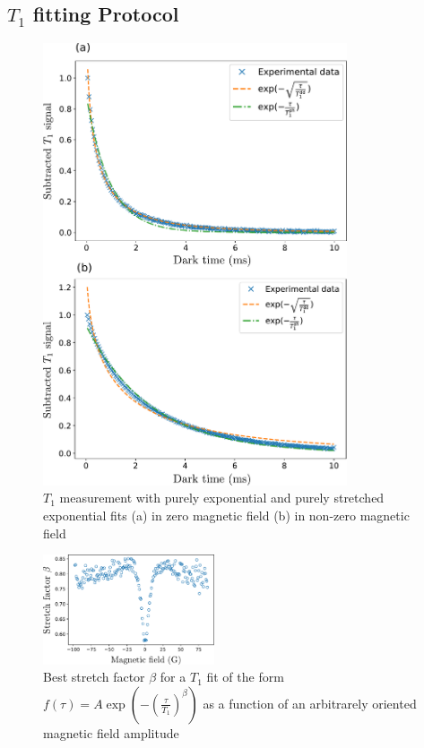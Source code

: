 \documentclass[preprintnumbers,amsmath,amssymb,onecolumn,12pt]{revtex4-2}\usepackage{graphicx}%
\begin{document}
\subsection{$T_1$ fitting Protocol}
\begin{figure}
\includegraphics[width=0.8\textwidth]{Figures_SI/Fig_T1_combined}
\caption{$T_1$ measurement with purely exponential and purely stretched exponential fits (a) in zero magnetic field (b) in non-zero magnetic field}
\label{T1_fits}
\end{figure}
\begin{figure}[h]
\includegraphics[width=0.45\textwidth]{Figures_SI/fig_alphas}
\caption{Best stretch factor $\beta$ for a $T_1$ fit of the form $f(\tau)=A \exp(-(\frac{\tau}{T_1})^\beta)$ as a function of an arbitrarely oriented magnetic field amplitude}
\label{alphas}
\end{figure}
\end{document}
